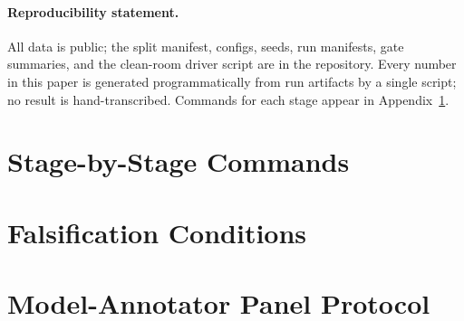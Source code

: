 \documentclass{article}
\begin{document}
\paragraph{Reproducibility statement.}
All data is public; the split manifest, configs, seeds, run manifests, gate
summaries, and the clean-room driver script are in the repository. Every
number in this paper is generated programmatically from run artifacts by a
single script; no result is hand-transcribed. Commands for each stage appear
in Appendix~\ref{app:commands}.




\appendix

\section{Stage-by-Stage Commands}
\label{app:commands}


\section{Falsification Conditions}
\label{app:conditions}


\section{Model-Annotator Panel Protocol}
\label{app:panel}

\end{document}
